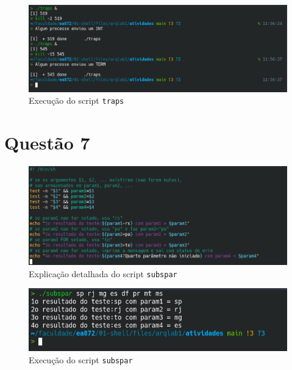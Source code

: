 \documentclass{article}
\begin{document}
\begin{figure}[!ht]
    \begin{center}
        \includegraphics[width=\textwidth]{images/q6_execucao.png}
        \caption{Execução do script \texttt{traps}}
    \end{center}
\end{figure}

\newpage
\section*{Questão 7}

\begin{figure}[!ht]
    \begin{center}
        \includegraphics[width=\textwidth]{images/q7.png}
        \caption{Explicação detalhada do script \texttt{subspar}}
        \label{fig:q7}
    \end{center}
\end{figure}

\begin{figure}[!ht]
    \begin{center}
        \includegraphics[width=\textwidth]{images/q7_execucao.png}
        \caption{Execução do script \texttt{subspar}}
        \label{fig:q7_exec}
    \end{center}
\end{figure}
\end{document}
